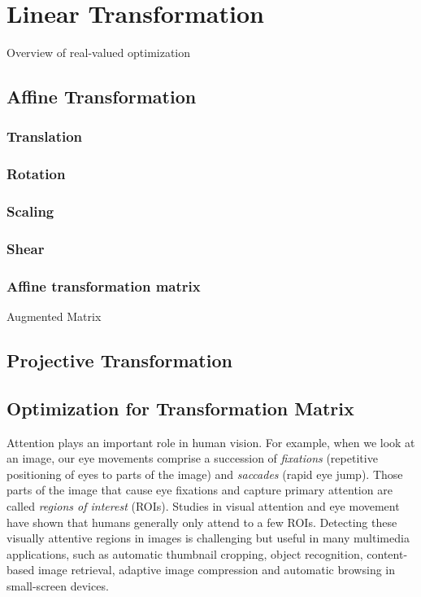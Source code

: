 \chapter{Linear Transformation}
\label{c:transformation}

Overview of real-valued optimization

\section{Affine Transformation}

\subsection{Translation}
\subsection{Rotation}
\subsection{Scaling}
\subsection{Shear}
\subsection{Affine transformation matrix}
Augmented Matrix

\section{Projective Transformation}


\section{Optimization for Transformation Matrix}

Attention plays an important role in human vision. For example, when
we look at an image, our eye movements comprise a succession of {\em
fixations} (repetitive positioning of eyes to parts of the image)
and {\em saccades} (rapid eye jump). Those parts of the image that
cause eye fixations and capture primary attention are called {\em
regions of interest} (ROIs). Studies in visual attention and eye
movement have shown that humans generally only attend to a few ROIs.
Detecting these visually attentive regions in images is challenging
but useful in many multimedia applications, such as automatic
thumbnail cropping, object recognition, content-based image
retrieval, adaptive image compression and automatic browsing in
small-screen devices.

